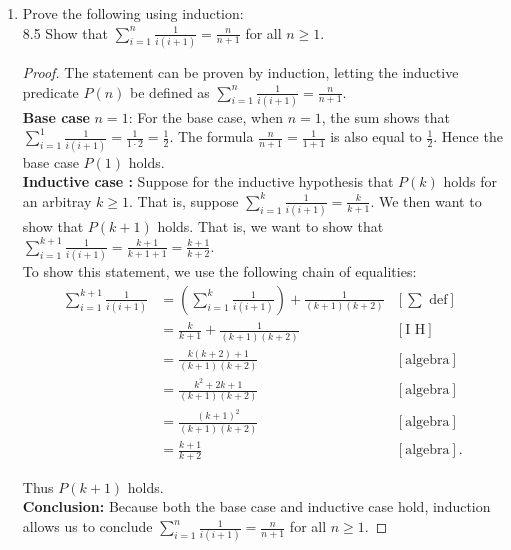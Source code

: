 \documentclass[10pt]{article}
\begin{document}
\begin{enumerate}[label={}]
    \item Prove the following using induction:\\

          8.5 Show that $\sum_{i=1}^n \frac{1}{i(i+1)}=\frac{n}{n+1}$ for all $n \geq 1$.
          \begin{proof}
              The statement can be proven by induction, letting the inductive predicate $P(n)$ be defined as $\sum_{i=1}^n \frac{1}{i(i+1)}=\frac{n}{n+1}$.\\

              \textbf{Base case} $n=1$: For the base case, when $n=1$, the sum shows that $\sum_{i=1}^1 \frac{1}{i(i+1)}=\frac{1}{1\cdot2}=\frac{1}{2}$. The formula $\frac{n}{n + 1}=\frac{1}{1+1}$ is also equal to $\frac{1}{2}$. Hence the base case $P(1)$ holds.\\

              \textbf{Inductive case :} Suppose for the inductive hypothesis that $P(k)$ holds for an arbitray $k \geq 1$. That is, suppose $\sum_{i=1}^k \frac{1}{i(i+1)}=\frac{k}{k+1}$.
              We then want to show that $P(k+1)$ holds. That is, we want to show that $\sum_{i=1}^{k+1} \frac{1}{i(i+1)}=\frac{k+1}{k+1+1}=\frac{k+1}{k+2}$.\\
              To show this statement, we use the following chain of equalities:
              $$
                  \begin{aligned} \sum_{i=1}^{k+1} \frac{1}{i(i+1)} & =\left(\sum_{i=1}^k \frac{1}{i(i+1)}\right)+\frac{1}{(k+1)(k+2)} & {\left[\sum \text { def}\right] } \\ & =\frac{k}{k+1}+\frac{1}{(k+1)(k+2)} & {\left[\text {I H}\right] }\\ & =\frac{k(k+2)+1}{(k+1)(k+2)} & {\left[\text {algebra}\right] }\\ & =\frac{k^2+2 k+1}{(k+1)(k+2)} & {\left[\text {algebra}\right] } \\ & =\frac{(k+1)^2}{(k+1)(k+2)} & {\left[\text {algebra}\right] } \\ & =\frac{k+1}{k+2} & {\left[\text {algebra}\right] }.
                  \end{aligned}
              $$

              Thus $P(k+1)$ holds.\\

              \textbf{Conclusion:} Because both the base case and inductive case hold, induction allows us to conclude $\sum_{i=1}^n \frac{1}{i(i+1)}=\frac{n}{n+1}$ for all $n \geq 1$.
          \end{proof}


\end{enumerate}
\end{document}
